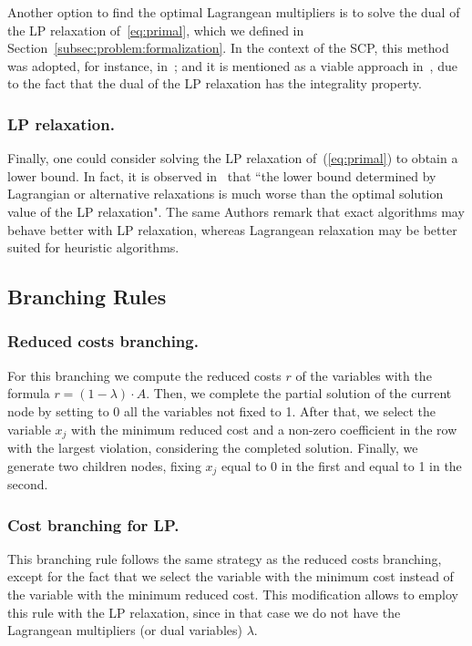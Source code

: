 \documentclass[runningheads]{llncs}
\begin{document}
Another option to find the optimal Lagrangean multipliers is to solve the dual of the LP relaxation of~\ref{eq:primal}, which we defined in Section~\ref{subsec:problem:formalization}. In the context of the SCP, this method was adopted, for instance, in~\cite{beasley-1987-algorithm,balas-ho-2009-set-covering}; and it is mentioned as a viable approach in~\cite{caprara-2000-algorithms}, due to the fact that the dual of the LP relaxation has the integrality property.

\subsubsection{LP relaxation.} Finally, one could consider solving the LP relaxation of~(\ref{eq:primal}) to obtain a lower bound. In fact, it is observed in~\cite{caprara-2000-algorithms} that ``the lower bound determined by Lagrangian or alternative relaxations is much worse than the optimal solution value of the LP relaxation". The same Authors remark that exact algorithms may behave better with LP relaxation, whereas Lagrangean relaxation may be better suited for heuristic algorithms.   

\subsection{Branching Rules}
\label{subsec:branch-bound:branch}

\subsubsection{Reduced costs branching.} For this branching we compute the reduced costs $r$ of the variables with the formula $r = (1 - \lambda) \cdot A$. Then, we complete the partial solution of the current node by setting to 0 all the variables not fixed to 1. After that, we select the variable $x_j$ with the minimum reduced cost and a non-zero coefficient in the row with the largest violation, considering the completed solution. Finally, we generate two children nodes, fixing $x_j$ equal to 0 in the first and equal to 1 in the second.

\subsubsection{Cost branching for LP.} This branching rule follows the same strategy as the reduced costs branching, except for the fact that we select the variable with the minimum cost instead of the variable with the minimum reduced cost. This modification allows to employ this rule with the LP relaxation, since in that case we do not have the Lagrangean multipliers (or dual variables) $\lambda$. 
\end{document}
